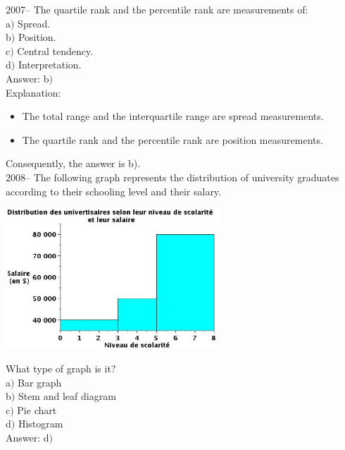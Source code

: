 \documentclass[letterpaper, 12pt]{article}
\begin{document}
2007-- The quartile rank and the percentile rank are measurements of: \\

a$)$ Spread.\\
b$)$ Position.\\
c$)$ Central tendency.\\
d$)$ Interpretation.\\

Answer: b$)$\\

Explanation:\\
\begin{itemize}
 \item The total range and the interquartile range are spread measurements. \\
\item The quartile rank and the percentile rank are position measurements.\\
\end{itemize}
Consequently, the answer is b).\\


2008-- The following graph represents the distribution of university graduates according to their schooling level and their salary.
\begin{center}
 \includegraphics[width=8cm,bb=14 14 611 415]{Q2008v.eps}
\end{center}

What type of graph is it?\\
a$)$ Bar graph\\
b$)$ Stem and leaf diagram\\
c$)$ Pie chart\\
d$)$ Histogram\\

Answer: d$)$\\
\end{document}
